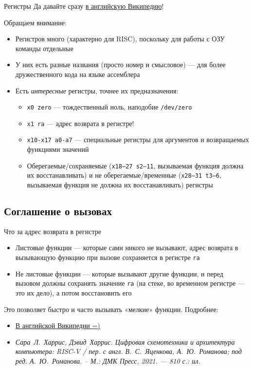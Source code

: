\documentclass[xetex,aspectratio=43]{beamer}
\begin{document}
\begin{frame}[fragile]{Регистры}
    Да давайте сразу \href{https://en.wikipedia.org/wiki/RISC-V\#Register_sets}{в английскую Википедию}!

    Обращаем внимание:
    \begin{itemize}
        \item Регистров много (характерно для RISC), поскольку для работы с ОЗУ команды отдельные
        \item У них есть разные названия (просто номер и смысловое) — для более дружественного кода на языке ассемблера
        \item Есть \emph{интересные} регистры, точнее их предназначения:
        \begin{itemize}
            \item \texttt{x0 zero} --- тождественный ноль, наподобие \texttt{/dev/zero}
            \item \texttt{x1 ra} --- адрес возврата в регистре!
            \item \texttt{x10-x17 a0-a7} --- специальные регистры для аргументов и возвращаемых функциями значений
            \item Оберегаемые/сохраняемые (\texttt{x18–27 s2–11}, вызываемая функция должна их восстанавливать) и не оберегаемые/временные (\texttt{x28–31 t3–6}, вызываемая функция не должна их восстанавливать) регистры
        \end{itemize}
    \end{itemize}
\end{frame}

\subsection{Соглашение о вызовах}

\begin{frame}{Что за адрес возврата в регистре}
    \begin{itemize}
        \item Листовые функции --- которые сами никого не вызывают, адрес возврата в вызывающую функцию при вызове сохраняется в регистре \texttt{ra}
        \item Не листовые функции --- которые вызывают другие функции, и перед вызовом должны сохранять значение \texttt{ra} (на стеке, во временном регистре — это их дело), а потом восстановить его
    \end{itemize}

    Это позволяет быстро и часто вызывать «мелкие» функции. Подробнее:
    \begin{itemize}
        \item \href{https://en.wikipedia.org/wiki/RISC-V\#Subroutine_calls,_jumps,_and_branches}{В английской Википедии =)}
        \item \emph{Сара~Л.~Харрис, Дэвид~Харрис. Цифровая схемотехника и архитектура компьютера: RISC-V / пер. с англ. В.~С.~Яценкова, А.~Ю.~Романова; под ред. А.~Ю.~Романова. – М.: ДМК Пресс, 2021. — 810 с.: ил.}
    \end{itemize}
\end{frame}
\end{document}
